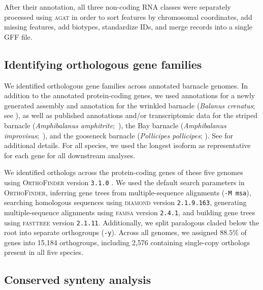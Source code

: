 After their annotation, all three non-coding RNA classes were separately processed
using \textsc{agat} in order to sort features by chromosomal coordinates, add
missing features, add biotypes, standardize IDs, and merge records into a single GFF file.

\subsection*{Identifying orthologous gene families}\label{sec:methods_orthologs}

We identified orthologous gene families across annotated barnacle genomes. In
addition to the \bgla{} annotated protein-coding genes, we used annotations for
a newly generated assembly and annotation for the wrinkled barnacle
(\textit{Balanus crenatus}; see ), as well as
published annotations and/or transcriptomic data for the striped barnacle
(\textit{Amphibalanus amphitrite};~\citealp{han_new_2024,kim_draft_2019}), the
Bay barnacle (\textit{Amphibalanus improvisus};~\citealp{bishop_genome_2025}),
and the gooseneck barnacle (\textit{Pollicipes pollicipes};
\citealp{bernot_chromosome-level_2022}).
See  for additional details.
For all species, we used the longest isoform as representative for each gene for
all downstream analyses.
\vspace{0.1cm}

We identified orthologs across the protein-coding genes of these five genomes using
\textsc{OrthoFinder} version \texttt{3.1.0} \citep{emms_orthofinder_2015,
emms_orthofinder_2019,emms_orthofinder_2025}. We used the default search parameters
in \textsc{OrthoFinder}, inferring gene trees from multiple-sequence alignments
(\texttt{-M msa}), searching homologous sequences using \textsc{diamond} version
\texttt{2.1.9.163}, generating multiple-sequence alignments using \textsc{famsa}
version \texttt{2.4.1}, and building gene trees using \textsc{fasttree} version
\texttt{2.1.11}. Additionally, we split paralogous claded below the root into
separate orthogroups (\texttt{-y}). Across all genomes, we assigned $88.5\%$ of
genes into 15{,}184 orthogroups, including 2{,}576 containing single-copy orthologs
present in all five species.

\subsection*{Conserved synteny analysis}

